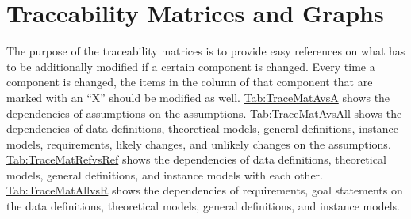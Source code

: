 \documentclass[12pt]{article}
\begin{document}
\section{Traceability Matrices and Graphs}
\label{Sec:TraceMatrices}
The purpose of the traceability matrices is to provide easy references on what has to be additionally modified if a certain component is changed. Every time a component is changed, the items in the column of that component that are marked with an ``X'' should be modified as well. \hyperref[Table:TraceMatAvsA]{Tab:TraceMatAvsA} shows the dependencies of assumptions on the assumptions. \hyperref[Table:TraceMatAvsAll]{Tab:TraceMatAvsAll} shows the dependencies of data definitions, theoretical models, general definitions, instance models, requirements, likely changes, and unlikely changes on the assumptions. \hyperref[Table:TraceMatRefvsRef]{Tab:TraceMatRefvsRef} shows the dependencies of data definitions, theoretical models, general definitions, and instance models with each other. \hyperref[Table:TraceMatAllvsR]{Tab:TraceMatAllvsR} shows the dependencies of requirements, goal statements on the data definitions, theoretical models, general definitions, and instance models.
\end{document}
